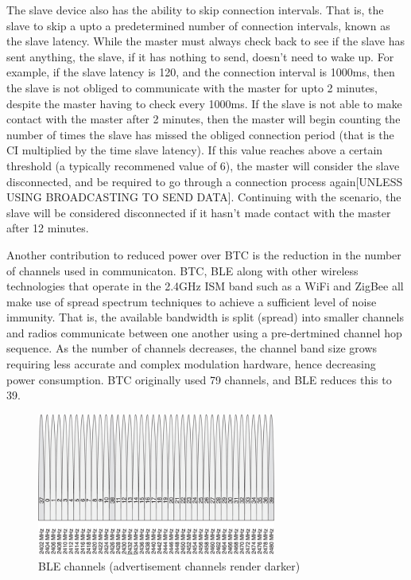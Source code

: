 \documentclass[]{article}
\begin{document}
The slave device also has the ability to skip connection intervals. That is, the slave to skip a upto a predetermined number of connection intervals, known as the slave latency. While the master must always check back to see if the slave has sent anything, the slave, if it has nothing to send, doesn't need to wake up. For example, if the slave latency is 120, and the connection interval is 1000ms, then the slave is not obliged to communicate with the master for upto 2 minutes, despite the master having to check every 1000ms. If the slave is not able to make contact with the master after 2 minutes, then the master will begin counting the number of times the slave has missed the obliged connection period (that is the \ac{CI} multiplied by the time slave latency). If this value reaches above a certain threshold (a typically recommened value of 6), the master will consider the slave disconnected, and be required to go through a connection process again[UNLESS USING BROADCASTING TO SEND DATA]. Continuing with the scenario, the slave will be considered disconnected if it hasn't made contact with the master after 12 minutes.

Another contribution to reduced power over \ac{BTC} is the reduction in the number of channels used in communicaton. \ac{BTC}, \ac{BLE} along with other wireless technologies that operate in the 2.4GHz ISM band such as a WiFi and ZigBee all make use of spread spectrum techniques to achieve a sufficient level of noise immunity. That is, the available bandwidth is split (spread) into smaller channels and radios communicate between one another using a pre-dertmined channel hop sequence. As the number of channels decreases, the channel band size grows requiring less accurate and complex modulation hardware, hence decreasing power consumption. \ac{BTC} originally used 79 channels, and \ac{BLE} reduces this to 39.

\begin{figure}[htb]
	\begin{center}
		\includegraphics[width = 0.7\textwidth]{blechannels}
	\end{center}
	\caption{\ac{BLE} channels (advertisement channels render darker)}
	\label{fig:blechannels}
\end{figure}
\end{document}
